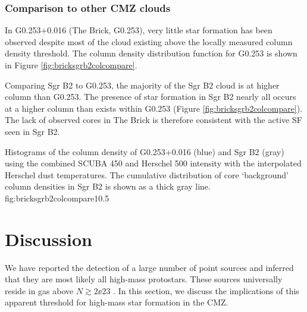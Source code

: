 \documentclass[twocolumn]{aastex61}
\begin{document}

\subsubsection{Comparison to other CMZ clouds}
In G0.253+0.016 (The Brick, G0.253), very little star formation
has been observed \citep{Longmore2013a,Johnston2014a,Rathborne2015a} despite
most of the cloud existing above the locally measured \citet{Lada2010a} column
density threshold.  The column density distribution function for G0.253
is shown in Figure \ref{fig:bricksgrb2colcompare}.

Comparing Sgr B2 to G0.253, the majority of the Sgr B2 cloud is at higher
column than G0.253.  The presence of star formation in Sgr B2 nearly all occurs
at a higher column than exists within G0.253 (Figure
\ref{fig:bricksgrb2colcompare}).  The lack of observed cores in The Brick is
therefore consistent with the active SF seen in Sgr B2.

{Histograms of the column density of G0.253+0.016 (blue) and Sgr B2 (gray)
using the combined SCUBA 450 \um and Herschel 500 \um intensity with the
interpolated Herschel dust temperatures.  The cumulative distribution of
core `background' column densities in Sgr B2 is shown as a thick gray
line.}
{fig:bricksgrb2colcompare}{1}{0.5\textwidth}

\section{Discussion}
We have reported the detection of a large number of point sources and inferred
that they are most likely all high-mass protostars.  These sources universally
reside in gas above $N\gtrsim2\ee{23}$ \persc.  In this section, we discuss
the implications of this apparent threshold for high-mass star formation in the
CMZ.
\end{document}
